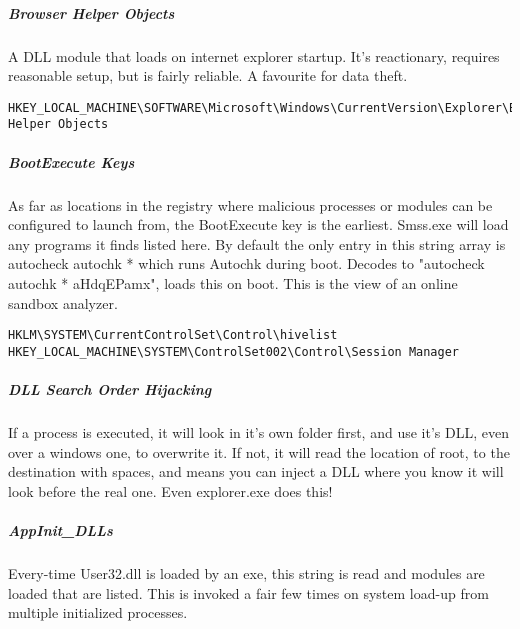 \subparagraph{Browser Helper Objects}
A DLL module that loads on internet explorer startup. It's reactionary, requires reasonable setup, but is fairly reliable. A favourite for data theft.
\begin{lstlisting}[label=RegistryBHO,caption=Registry BHO Locations]
HKEY_LOCAL_MACHINE\SOFTWARE\Microsoft\Windows\CurrentVersion\Explorer\Browser Helper Objects
\end{lstlisting}

\subparagraph{BootExecute Keys}
As far as locations in the registry where malicious processes or modules can be configured to launch from, the BootExecute key is the earliest. 
Smss.exe will load any programs it finds listed here. By default the only entry in this string array is autocheck autochk * which runs Autochk during boot.
Decodes to "autocheck autochk * aHdqEPamx", loads this on boot. This is the view of an online sandbox analyzer.

\begin{lstlisting}[label=RegistryBootExecute,caption=Registry BootExecute Locations]
HKLM\SYSTEM\CurrentControlSet\Control\hivelist
HKEY_LOCAL_MACHINE\SYSTEM\ControlSet002\Control\Session Manager
\end{lstlisting}

\subparagraph{DLL Search Order Hijacking}
If a process is executed, it will look in it's own folder first, and use it's DLL, even over a windows one, to overwrite it. If not, it will read the location of root, 
to the destination with spaces, and means you can inject a DLL where you know it will look before the real one. Even explorer.exe does this!

\subparagraph{AppInit\_DLLs}
Every-time User32.dll is loaded by an exe, this string is read and modules are loaded that are listed. This is invoked a fair few times on system load-up from multiple initialized processes.

